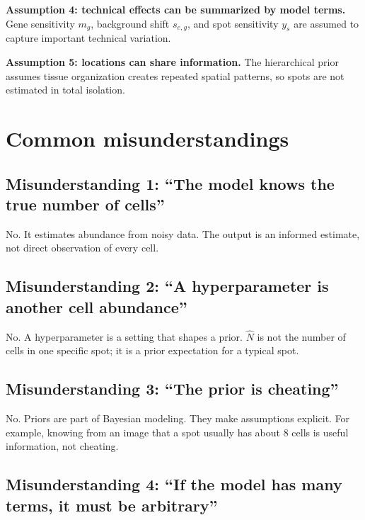 \documentclass[11pt]{article}
\newcommand{\term}[1]{\textbf{#1}}
\begin{document}
\begin{assumptionbox}
\term{Assumption 4: technical effects can be summarized by model terms.} Gene sensitivity $m_g$, background shift $s_{e,g}$, and spot sensitivity $y_s$ are assumed to capture important technical variation.
\end{assumptionbox}

\begin{assumptionbox}
\term{Assumption 5: locations can share information.} The hierarchical prior assumes tissue organization creates repeated spatial patterns, so spots are not estimated in total isolation.
\end{assumptionbox}

\section{Common misunderstandings}

\subsection{Misunderstanding 1: ``The model knows the true number of cells''}

No. It estimates abundance from noisy data. The output is an informed estimate, not direct observation of every cell.

\subsection{Misunderstanding 2: ``A hyperparameter is another cell abundance''}

No. A hyperparameter is a setting that shapes a prior. $\hat N$ is not the number of cells in one specific spot; it is a prior expectation for a typical spot.

\subsection{Misunderstanding 3: ``The prior is cheating''}

No. Priors are part of Bayesian modeling. They make assumptions explicit. For example, knowing from an image that a spot usually has about 8 cells is useful information, not cheating.

\subsection{Misunderstanding 4: ``If the model has many terms, it must be arbitrary''}
\end{document}
